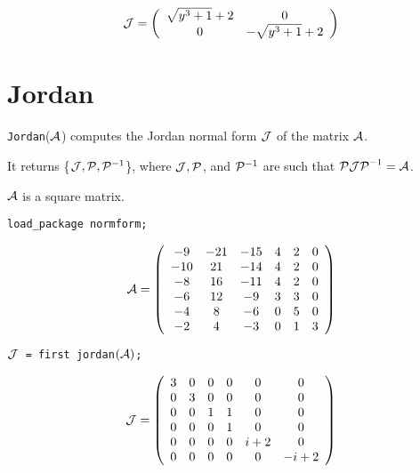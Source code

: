 \vspace{0.2in}
\begin{displaymath}
{\cal J} = \left( \begin{array}{cc} \sqrt{y^3+1} + 2 & 0 \\ 0 &
-\sqrt{y^3+1} + 2 \end{array} \right)
\end{displaymath}



\section{Jordan}

{\tt Jordan}(${\cal A}$) computes the Jordan normal form
${\cal J}$ of the matrix ${\cal A}$.

It returns \{${\cal J}, {\cal P}, {\cal P}^{-1}$\}, where
${\cal J}, {\cal P}$, and ${\cal P}^{-1}$ are such that ${\cal P J P}^
{-1} = {\cal A}$.

${\cal A}$ is a square matrix.

{\tt load\_package normform;}

\begin{displaymath}
{\cal A} = \left( \begin{array}{cccccc} -9 & -21 & -15 & 4 & 2 & 0 \\
-10 & 21 & -14 & 4 & 2 & 0 \\ -8 & 16 & -11 & 4 & 2 & 0 \\ -6 & 12 & -9
& 3 & 3 & 0 \\ -4 & 8 & -6 & 0 & 5 & 0 \\ -2 & 4 & -3 & 0 & 1 & 3
\end{array} \right)
\end{displaymath}

\begin{flushleft}
{\tt ${\cal J}$ = first jordan$({\cal A})$;}
\end{flushleft}

\begin{displaymath}
{\cal J} = \left( \begin{array}{cccccc} 3 & 0 & 0 & 0 & 0 & 0 \\ 0 & 3
& 0 & 0 & 0 & 0 \\ 0 & 0 & 1 & 1 & 0 & 0 \\ 0 & 0 & 0 & 1 & 0 & 0 \\
 0 & 0 & 0 & 0 & i+2 & 0 \\ 0 & 0 & 0 & 0 & 0 & -i+2
\end{array} \right)
\end{displaymath}

